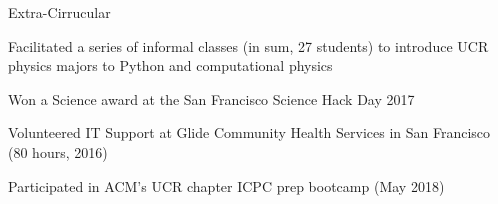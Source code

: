 \documentclass{resume} %
\newcommand{\tab}[1]{\hspace{.2667\textwidth}\rlap{#1}}
\newcommand{\itab}[1]{\hspace{0em}\rlap{#1}}
\begin{document}


\begin{rSection}{Extra-Cirrucular} \itemsep -3pt
\item Facilitated a series of informal classes (in sum, 27 students) to introduce UCR physics majors to Python and computational physics
\item Won a Science award at the San Francisco Science Hack Day 2017
\item Volunteered IT Support at Glide Community Health Services in San Francisco (80 hours, 2016)
\item Participated in ACM's UCR chapter ICPC prep bootcamp (May 2018)

\end{rSection}
\end{document}
